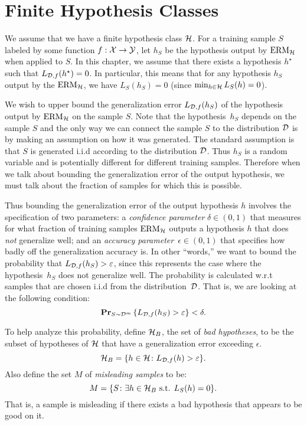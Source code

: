 \section{Finite Hypothesis Classes}

We assume that we have a finite hypothesis class $\mathcal{H}$. For a training
sample $S$ labeled by some function $f: \mathcal{X} \rightarrow \mathcal{Y}$, let $h_S$
be the hypothesis output by $\text{ERM}_{\mathcal{H}}$ when applied to $S$. In this chapter,
we assume that there exists a hypothesis $h^{\star}$ such that
$L_{\mathcal{D}, f}(h^{\star}) = 0$. In particular, this means that for any hypothesis $h_S$
output by the $\text{ERM}_{\mathcal{H}}$, we have $L_S(h_S) = 0$ (since
$\min_{h \in \mathcal{H}} L_S(h) = 0$).

We wish to upper bound the generalization error $L_{\mathcal{D}, f}(h_S)$ of the hypothesis
output by $\text{ERM}_{\mathcal{H}}$ on the sample $S$. Note that the hypothesis~$h_S$ depends
on the sample $S$ and the only way we can connect the sample $S$ to the distribution
$\mathcal{D}$ is by making an assumption on how it was generated. The standard assumption
is that $S$ is generated i.i.d according to the distribution $\mathcal{D}$. Thus $h_S$ is
a random variable and is potentially different for different training samples.
Therefore when we talk about bounding the generalization error of the output
hypothesis, we must talk about the fraction of samples for which this is
possible.

Thus bounding the generalization error of the output hypothesis $h$ involves
the specification of two parameters:
a \emph{confidence parameter} $\delta \in (0, 1)$ that measures for what fraction
of training samples $\text{ERM}_{\mathcal{H}}$ outputs a hypothesis $h$ that does \emph{not}
generalize well; and an \emph{accuracy parameter}~$\epsilon \in (0, 1)$ that
specifies how badly off the generalization accuracy is. In other ``words,'' we
want to bound the probability that $L_{\mathcal{D}, f}(h_S) > \varepsilon$, since this represents
the case where the hypothesis~$h_S$ does not generalize well. The probability is
calculated w.r.t samples that are chosen i.i.d from the distribution~$\mathcal{D}$.
That is, we are looking at the following condition:
\begin{equation}
    \mathbf{Pr}_{S \sim \mathcal{D}^m} \left \{ L_{\mathcal{D}, f}(h_S) > \varepsilon \right \} < \delta.
\end{equation}

To help analyze this probability, define $\mathcal{H}_{B}$, the set of \emph{bad hypotheses},
to be the subset of hypotheses of $\mathcal{H}$ that have a generalization error
exceeding $\epsilon$.
\[
    \mathcal{H}_{B} = \{h \in \mathcal{H} \colon L_{\mathcal{D}, f}(h) > \varepsilon\}.
\]
Also define the set $M$ of \emph{misleading samples} to be:
\[
    M = \{S \colon \exists h \in \mathcal{H}_{B} \text{ s.t. } L_S(h) = 0\}.
\]
That is, a sample is misleading if there exists a bad hypothesis that appears to be
good on it.

